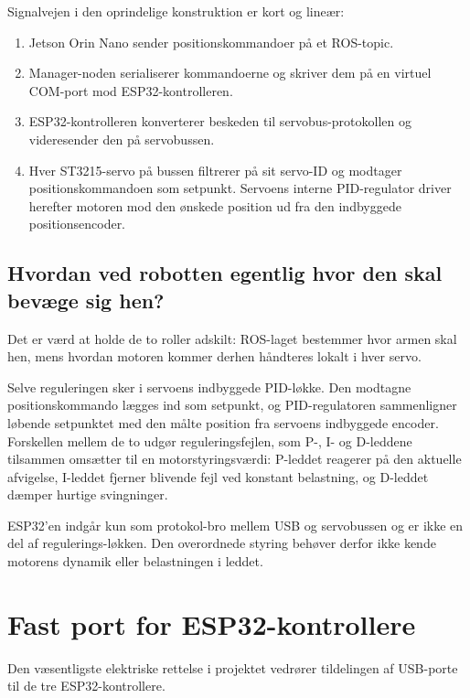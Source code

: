 Signalvejen i den oprindelige konstruktion er kort og lineær:

\begin{enumerate}
    \item Jetson Orin Nano sender positionskommandoer på et ROS-topic.
    \item Manager-noden serialiserer kommandoerne og skriver dem på en
          virtuel COM-port mod ESP32-kontrolleren.
    \item ESP32-kontrolleren konverterer beskeden til servobus-protokollen og
          videresender den på servobussen.
    \item Hver ST3215-servo på bussen filtrerer på sit servo-ID og
          modtager positionskommandoen som setpunkt. Servoens interne
          PID-regulator driver herefter motoren mod den ønskede position
          ud fra den indbyggede positionsencoder.
\end{enumerate}

\subsection{Hvordan ved robotten egentlig hvor den skal bevæge sig hen?}

Det er værd at holde de to roller adskilt: ROS-laget bestemmer hvor
armen skal hen, mens hvordan motoren kommer derhen håndteres lokalt i
hver servo.

Selve reguleringen sker i servoens indbyggede PID-løkke. Den modtagne
positionskommando lægges ind som setpunkt, og PID-regulatoren
sammenligner løbende setpunktet med den målte position fra servoens
indbyggede encoder. Forskellen mellem de to udgør reguleringsfejlen,
som P-, I- og D-leddene tilsammen omsætter til en motorstyrings\-værdi:
P-leddet reagerer på den aktuelle afvigelse, I-leddet fjerner blivende
fejl ved konstant belastning, og D-leddet dæmper hurtige svingninger.

ESP32'en indgår kun som protokol-bro mellem USB og servobussen og er
ikke en del af regulerings-løkken. Den overordnede styring behøver
derfor ikke kende motorens dynamik eller belastningen i leddet.

\section{Fast port for ESP32-kontrollere}
\label{sec:usb-binding}

Den væsentligste elektriske rettelse i projektet vedrører tildelingen
af USB-porte til de tre ESP32-kontrollere.

